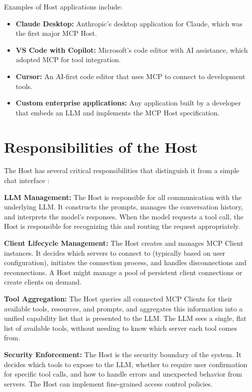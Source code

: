 Examples of Host applications include:
\begin{itemize}
    \item \textbf{Claude Desktop:} Anthropic's desktop application for Claude, which was the first major MCP Host.
    \item \textbf{VS Code with Copilot:} Microsoft's code editor with AI assistance, which adopted MCP for tool integration.
    \item \textbf{Cursor:} An AI-first code editor that uses MCP to connect to development tools.
    \item \textbf{Custom enterprise applications:} Any application built by a developer that embeds an LLM and implements the MCP Host specification.
\end{itemize}

\section{Responsibilities of the Host}
The Host has several critical responsibilities that distinguish it from a simple chat interface \cite{anthropic2024mcp}:

\textbf{LLM Management:} The Host is responsible for all communication with the underlying LLM. It constructs the prompts, manages the conversation history, and interprets the model's responses. When the model requests a tool call, the Host is responsible for recognizing this and routing the request appropriately.

\textbf{Client Lifecycle Management:} The Host creates and manages MCP Client instances. It decides which servers to connect to (typically based on user configuration), initiates the connection process, and handles disconnections and reconnections. A Host might manage a pool of persistent client connections or create clients on demand.

\textbf{Tool Aggregation:} The Host queries all connected MCP Clients for their available tools, resources, and prompts, and aggregates this information into a unified capability list that is presented to the LLM. The LLM sees a single, flat list of available tools, without needing to know which server each tool comes from.

\textbf{Security Enforcement:} The Host is the security boundary of the system. It decides which tools to expose to the LLM, whether to require user confirmation for specific tool calls, and how to handle errors and unexpected behavior from servers. The Host can implement fine-grained access control policies.

